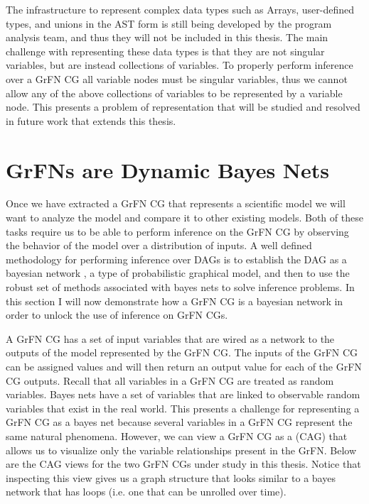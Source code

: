 The infrastructure to represent complex data types such as Arrays, user-defined types, and unions in the AST form is still being developed by the program analysis team, and thus they will not be included in this thesis. The main challenge with representing these data types is that they are not singular variables, but are instead collections of variables. To properly perform inference over a GrFN CG all variable nodes must be singular variables, thus we cannot allow any of the above collections of variables to be represented by a variable node. This presents a problem of representation that will be studied  and resolved in future work that extends this thesis.

\section{GrFNs are Dynamic Bayes Nets\label{sec:grfn_as_dbn}}
Once we have extracted a GrFN CG that represents a scientific model we will want to analyze the model and compare it to other existing models.
Both of these tasks require us to be able to perform inference on the GrFN CG by observing the behavior of the model over a distribution of inputs.
A well defined methodology for performing inference over DAGs is to establish the DAG as a bayesian network \citep{bishop2006pattern}, a type of probabilistic graphical model, and then to use the robust set of methods associated with bayes nets to solve inference problems.
In this section I will now demonstrate how a GrFN CG is a bayesian network in order to unlock the use of inference on GrFN CGs.

A GrFN CG has a set of input variables that are wired as a network to the outputs of the model represented by the GrFN CG.
The inputs of the GrFN CG can be assigned values and will then return an output value for each of the GrFN CG outputs.
Recall that all variables in a GrFN CG are treated as random variables.
Bayes nets have a set of variables that are linked to observable random variables that exist in the real world.
This presents a challenge for representing a GrFN CG as a bayes net because several variables in a GrFN CG represent the same natural phenomena.
However, we can view a GrFN CG as a  (CAG) that allows us to visualize only the variable relationships present in the GrFN.
Below are the CAG views for the two GrFN CGs under study in this thesis. Notice that inspecting this view gives us a graph structure that looks similar to a bayes network that has loops (i.e. one that can be unrolled over time).

